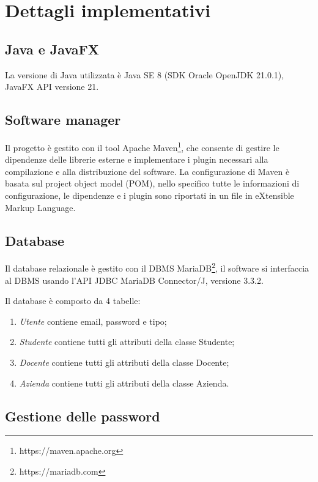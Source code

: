 \documentclass[12pt]{article}
\begin{document}
\section{Dettagli implementativi}

\subsection{Java e JavaFX}

La versione di Java utilizzata è Java SE 8 (SDK Oracle OpenJDK 21.0.1), JavaFX API versione 21.


\subsection{Software manager}

Il progetto è gestito con il tool Apache Maven\footnote{https://maven.apache.org}, che consente di gestire le dipendenze delle librerie esterne e implementare i plugin necessari alla compilazione e alla distribuzione del software. La configurazione di Maven è basata sul project object model (POM), nello specifico tutte le informazioni di configurazione, le dipendenze e i plugin sono riportati in un file in eXtensible Markup Language.


\subsection{Database}

Il database relazionale è gestito con il DBMS MariaDB\footnote{https://mariadb.com}, il software si interfaccia al DBMS usando l'API JDBC MariaDB Connector/J, versione 3.3.2.

Il database è composto da 4 tabelle:
\begin{enumerate}
   \item \textit{Utente} contiene email, password e tipo;
   \item \textit{Studente} contiene tutti gli attributi della classe Studente;
   \item \textit{Docente} contiene tutti gli attributi della classe Docente;
   \item \textit{Azienda} contiene tutti gli attributi della classe Azienda.
\end{enumerate}


\subsection{Gestione delle password}
\end{document}
